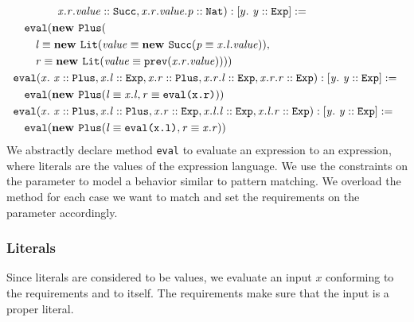 \begin{align*}
&\qquad\qquad
                  \mathit{x.r.value} :: \mathit{\texttt{Succ}},
                  \mathit{x.r.value.p} :: \mathit{\texttt{Nat}}
              ): [y.\ \mathit{\mathit{y} :: \mathit{\texttt{Exp}}}] :=\\
&\quad\texttt{eval}(
           \textbf{new } \texttt{Plus}(\\
             &\qquad\mathit{l} \equiv \mathit{
               \textbf{new } \mathit{\texttt{Lit}}(\mathit{\mathit{value} \equiv \mathit{ \textbf{new } \mathit{\texttt{Succ}}(\mathit{\mathit{p} \equiv \mathit{x.l.value}})}})},\\
             &\qquad\mathit{r} \equiv \mathit{
               \textbf{new } \mathit{\texttt{Lit}}(\mathit{\mathit{value} \equiv \mathit{\texttt{prev}(x.r.\mathit{value})}})}
           )
         )\\
&\mathit{\texttt{eval}}(\mathit{x}.\ \mathit{\mathit{x} :: \mathit{\texttt{Plus}},
        \mathit{x.l} :: \mathit{\texttt{Exp}},
        \mathit{x.r} :: \mathit{\texttt{Plus}},
        \mathit{x.r.l} :: \mathit{\texttt{Exp}},
        \mathit{x.r.r} :: \mathit{\texttt{Exp}}}): \mathit{[y.\ \mathit{\mathit{y} :: \mathit{\texttt{Exp}}}]} := \mathit{}\\
       &\quad\texttt{eval}(
         \textbf{new } \mathit{\texttt{Plus}}(\mathit{
                     \mathit{l} \equiv \mathit{x.l},
                     \mathit{r} \equiv \mathit{\texttt{eval(x.r)}}
                   })
       )\\
&\mathit{\texttt{eval}}(\mathit{x}.\ \mathit{\mathit{x} :: \mathit{\texttt{Plus}},
        \mathit{x.l} :: \mathit{\texttt{Plus}},
        \mathit{x.r} :: \mathit{\texttt{Exp}},
        \mathit{x.l.l} :: \mathit{\texttt{Exp}},
        \mathit{x.l.r} :: \mathit{\texttt{Exp}}}): \mathit{[y.\ \mathit{\mathit{y} :: \mathit{\texttt{Exp}}}]} := \mathit{}\\
       &\quad\texttt{eval}(
         \textbf{new } \mathit{\texttt{Plus}}(\mathit{
                     \mathit{l} \equiv \mathit{\texttt{eval(x.l)}},
                     \mathit{r} \equiv \mathit{x.r}
                   })
       )
\end{align*}
We abstractly declare method \texttt{eval}
to evaluate an expression to an expression,
where literals are the values of the expression language.
We use the constraints on the parameter to
model a behavior similar to pattern matching.
We overload the method for each case
we want to match and set the requirements
on the parameter accordingly.

\subsubsection{Literals}
Since literals are considered to be values,
we evaluate an input $x$ conforming to the requirements
 and  to itself.
The requirements make sure that the input is a proper literal.

